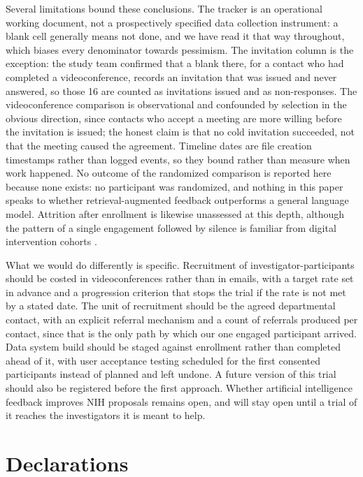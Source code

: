 \documentclass[11pt,a4paper]{article}
\begin{document}
Several limitations bound these conclusions. The tracker is an operational working document, not a prospectively specified data collection instrument: a blank cell generally means not done, and we have read it that way throughout, which biases every denominator towards pessimism. The invitation column is the exception: the study team confirmed that a blank there, for a contact who had completed a videoconference, records an invitation that was issued and never answered, so those 16 are counted as invitations issued and as non-responses. The videoconference comparison is observational and confounded by selection in the obvious direction, since contacts who accept a meeting are more willing before the invitation is issued; the honest claim is that no cold invitation succeeded, not that the meeting caused the agreement. Timeline dates are file creation timestamps rather than logged events, so they bound rather than measure when work happened. No outcome of the randomized comparison is reported here because none exists: no participant was randomized, and nothing in this paper speaks to whether retrieval-augmented feedback outperforms a general language model. Attrition after enrollment is likewise unassessed at this depth, although the pattern of a single engagement followed by silence is familiar from digital intervention cohorts \cite{r44}.

What we would do differently is specific. Recruitment of investigator-participants should be costed in videoconferences rather than in emails, with a target rate set in advance and a progression criterion that stops the trial if the rate is not met by a stated date. The unit of recruitment should be the agreed departmental contact, with an explicit referral mechanism and a count of referrals produced per contact, since that is the only path by which our one engaged participant arrived. Data system build should be staged against enrollment rather than completed ahead of it, with user acceptance testing scheduled for the first consented participants instead of planned and left undone. A future version of this trial should also be registered before the first approach. Whether artificial intelligence feedback improves NIH proposals remains open, and will stay open until a trial of it reaches the investigators it is meant to help.

\section*{Declarations}
\end{document}
